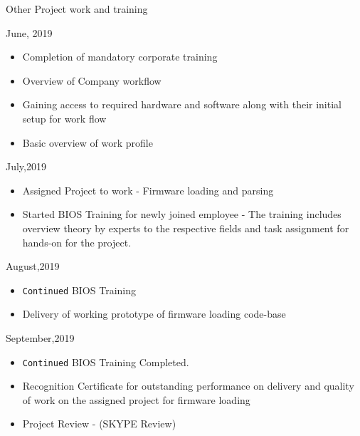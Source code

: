 \documentclass{beamer}
\begin{document}
\begin{frame}[allowframebreaks]{Other Project work and training}

    \begin{redblock}{June, 2019}
        \begin{itemize}
            \item Completion of mandatory corporate training
            \item Overview of Company workflow
            \item Gaining access to required hardware and software along with their initial setup for work flow
            \item Basic overview of work profile
        \end{itemize}
    \end{redblock}
    
    \begin{greenblock}{July,2019}
        \begin{itemize}
            \item Assigned Project to work - Firmware loading and parsing
            \item Started BIOS Training for newly joined employee - The training includes overview theory by experts to the respective fields and task assignment for hands-on for the project.
        \end{itemize}
    \end{greenblock}

    \begin{redblock}{August,2019}
        \begin{itemize}
            \item \verb|Continued| BIOS Training
            \item Delivery of working prototype of firmware loading code-base
        \end{itemize}
    \end{redblock}

    \begin{greenblock}{September,2019}
        \begin{itemize}
            \item \verb|Continued| BIOS Training Completed.
            \item Recognition Certificate for outstanding performance on delivery and quality of work on the assigned project for firmware loading
            \item Project Review - (SKYPE Review)
        \end{itemize}
    \end{greenblock}


\end{frame}
\end{document}
